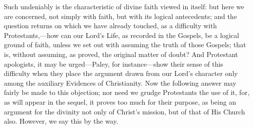 Such undeniably is the characteristic of divine
faith viewed in itself: but here we are concerned, not simply with
faith, but with its logical antecedents; and the question returns on
which we have already touched, as a difficulty with Protestants,—how
can our Lord's Life, as recorded in the Gospels, be a logical ground
of faith, unless we set out with assuming the truth of those Gospels;
that is, without assuming, as proved, the original matter of doubt?
And Protestant apologists, it may be urged—Paley, for
instance—show their sense of this difficulty when they place the
argument drawn from our Lord's character only among the auxiliary
Evidences of Christianity. Now the following answer may fairly
be made to this objection; nor need we grudge Protestants the use of
it, for, as will appear in the sequel, it proves too much for their
purpose, as being an argument for the divinity not only of Christ's
mission, but of that of His Church also. However, we say this by the
way.

